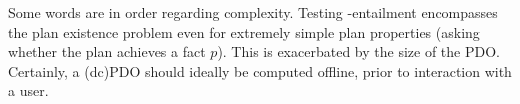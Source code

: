 Some words are in order regarding complexity. Testing
\plans-entailment encompasses the plan existence problem even for
extremely simple plan properties (asking whether the plan achieves a
fact $p$). This is exacerbated by the size of the PDO. Certainly, a
(dc)PDO should ideally be computed offline, prior to interaction with
a user. 
%
%
%
%


